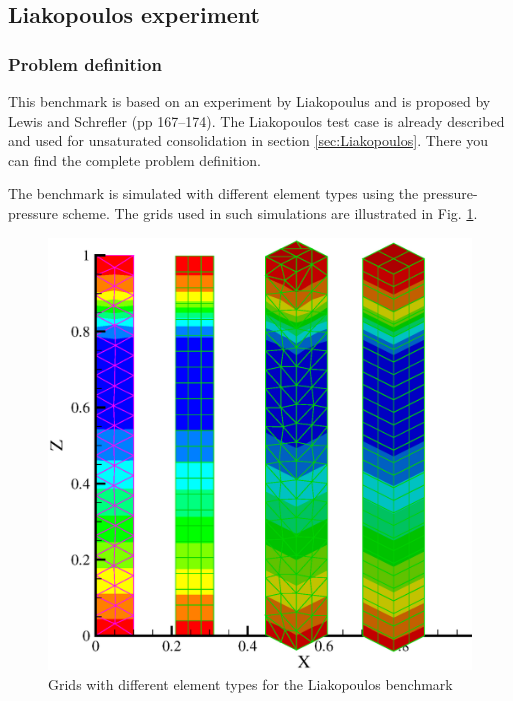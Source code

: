 \subsection{Liakopoulos experiment}

\subsubsection*{Problem definition}

This benchmark is based on an experiment by Liakopoulus \cite{Lia:65} and is proposed by Lewis and Schrefler \cite{LewSch:98}(pp 167--174).
The Liakopoulos test case is already described and used for unsaturated consolidation in section \ref{sec:Liakopoulos}.
There you can find the complete problem definition.

The benchmark is simulated with different element types using the pressure-pressure scheme. The grids used in such simulations are illustrated in Fig. \ref{liak:grids}.

\begin{figure}[!thb]
  \begin{center}
 \includegraphics[scale=0.35]{HH/figures/liak_elems.eps}
\end{center}
\caption{Grids with different element types for the Liakopoulos benchmark}
\label{liak:grids}
\end{figure}

